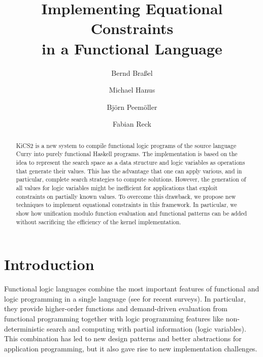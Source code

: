 \documentclass{llncs}
\begin{document}
\sloppy

\title{Implementing Equational Constraints\\ in a Functional Language}

\author{
Bernd Bra{\ss}el
\and
Michael Hanus
\and
Bj{\"o}rn Peem{\"o}ller
\and
Fabian Reck
}

\maketitle

\begin{abstract}
KiCS2 is a new system
to compile functional logic programs of the source language Curry
into purely functional Haskell programs.
The implementation is based on the idea to represent
the search space as a data structure and logic variables
as operations that generate their values.
This has the advantage that one can apply various,
and in particular, complete search strategies to compute solutions.
However, the generation of all values for logic variables
might be inefficient for applications that
exploit constraints on partially known values.
To overcome this drawback, we propose new techniques
to implement equational constraints in this framework.
In particular, we show how unification modulo function evaluation
and functional patterns can be added without sacrificing
the efficiency of the kernel implementation.
\end{abstract}


\section{Introduction}
\label{sec:Introduction}

Functional logic languages combine the most important
features of functional and logic programming in a single language
(see \cite{AntoyHanus10CACM,Hanus07ICLP} for recent surveys).
In particular, they provide higher-order functions and demand-driven
evaluation from functional programming together with logic programming features
like non-deterministic search and computing with partial information
(logic variables).
This combination
has led to new design patterns \cite{AntoyHanus02FLOPS,AntoyHanus11WFLP}
and better abstractions for application programming, but it also gave rise
to new implementation challenges.
\end{document}
